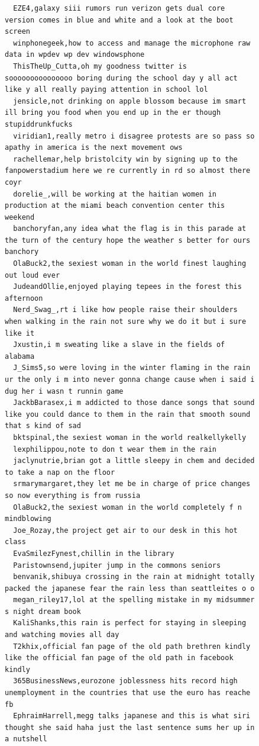 \begin{figure}[htpb]
\begin{verbatim}
  EZE4,galaxy siii rumors run verizon gets dual core version comes in blue and white and a look at the boot screen
  winphonegeek,how to access and manage the microphone raw data in wpdev wp dev windowsphone
  ThisTheUp_Cutta,oh my goodness twitter is sooooooooooooooo boring during the school day y all act like y all really paying attention in school lol
  jensicle,not drinking on apple blossom because im smart ill bring you food when you end up in the er though stupiddrunkfucks
  viridian1,really metro i disagree protests are so pass so apathy in america is the next movement ows
  rachellemar,help bristolcity win by signing up to the fanpowerstadium here we re currently in rd so almost there coyr
  dorelie_,will be working at the haitian women in production at the miami beach convention center this weekend
  banchoryfan,any idea what the flag is in this parade at the turn of the century hope the weather s better for ours banchory
  OlaBuck2,the sexiest woman in the world finest laughing out loud ever
  JudeandOllie,enjoyed playing tepees in the forest this afternoon
  Nerd_Swag_,rt i like how people raise their shoulders when walking in the rain not sure why we do it but i sure like it
  Jxustin,i m sweating like a slave in the fields of alabama
  J_Sims5,so were loving in the winter flaming in the rain ur the only i m into never gonna change cause when i said i dug her i wasn t runnin game
  JackbBarasex,i m addicted to those dance songs that sound like you could dance to them in the rain that smooth sound that s kind of sad
  bktspinal,the sexiest woman in the world realkellykelly
  lexphilippou,note to don t wear them in the rain
  jaclynutrie,brian got a little sleepy in chem and decided to take a nap on the floor
  srmarymargaret,they let me be in charge of price changes so now everything is from russia
  OlaBuck2,the sexiest woman in the world completely f n mindblowing
  Joe_Rozay,the project get air to our desk in this hot class
  EvaSmilezFynest,chillin in the library
  Paristownsend,jupiter jump in the commons seniors
  benvanik,shibuya crossing in the rain at midnight totally packed the japanese fear the rain less than seattleites o o
  megan_riley17,lol at the spelling mistake in my midsummer s night dream book
  KaliShanks,this rain is perfect for staying in sleeping and watching movies all day
  T2khix,official fan page of the old path brethren kindly like the official fan page of the old path in facebook kindly
  365BusinessNews,eurozone joblessness hits record high unemployment in the countries that use the euro has reache fb
  EphraimHarrell,megg talks japanese and this is what siri thought she said haha just the last sentence sums her up in a nutshell

\end{verbatim}
\end{figure}
